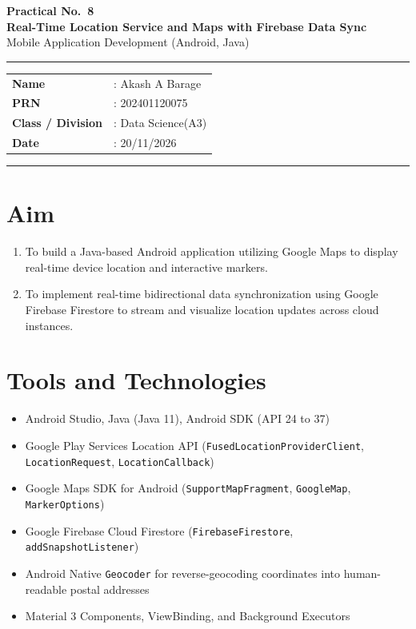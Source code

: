 \documentclass[12pt,a4paper]{article}
\begin{document}
\begin{center}
  {\LARGE \textbf{Practical No.\ 8}}\\[6pt]
  {\Large \textbf{Real-Time Location Service and Maps with Firebase Data Sync}}\\[6pt]
  {\large Mobile Application Development (Android, Java)}
\end{center}

\vspace{4pt}
\hrule
\vspace{8pt}

\noindent
\begin{tabular}{@{}ll}
  \textbf{Name}            & : Akash A Barage \\
  \textbf{PRN}             & : 202401120075 \\
  \textbf{Class / Division}& : Data Science(A3) \\
  \textbf{Date}            & : 20/11/2026 \\
\end{tabular}

\vspace{8pt}
\hrule

\section*{Aim}
\begin{enumerate}[itemsep=2pt]
  \item To build a Java-based Android application utilizing Google Maps to display real-time device location and interactive markers.
  \item To implement real-time bidirectional data synchronization using Google Firebase Firestore to stream and visualize location updates across cloud instances.
\end{enumerate}

\section*{Tools and Technologies}
\begin{itemize}[itemsep=2pt]
  \item Android Studio, Java (Java 11), Android SDK (API 24 to 37)
  \item Google Play Services Location API (\texttt{FusedLocationProviderClient}, \texttt{LocationRequest}, \texttt{LocationCallback})
  \item Google Maps SDK for Android (\texttt{SupportMapFragment}, \texttt{GoogleMap}, \texttt{MarkerOptions})
  \item Google Firebase Cloud Firestore (\texttt{FirebaseFirestore}, \texttt{addSnapshotListener})
  \item Android Native \texttt{Geocoder} for reverse-geocoding coordinates into human-readable postal addresses
  \item Material 3 Components, ViewBinding, and Background Executors
\end{itemize}
\end{document}
